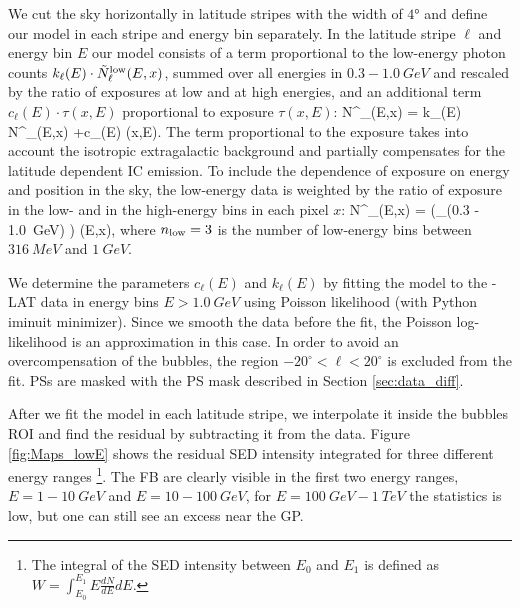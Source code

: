 We cut the sky horizontally in latitude stripes with the width of $\ang{4}$ and define our model in each stripe and energy bin separately. 
In the latitude stripe $\ell$ and energy bin $E$ our model consists of a term proportional to the low-energy photon counts 
$k_{\ell}(E) \cdot \tilde N^{\text{low}}_\ell(E, x)$, summed over all energies in $0.3 - \SI{1.0}{GeV}$ 
and rescaled by the ratio of exposures at low and at high energies,
and an additional term $c_\ell(E) \cdot \tau(x,E)$ proportional to exposure $\tau(x,E)$:
\be
N^\model_{\ell}(E,x) = k_{\ell}(E) \cdot \tilde N^\low_{\ell}(E,x) +c_\ell(E) \cdot \tau(x,E).
\ee
The term proportional to the exposure takes into account the isotropic extragalactic background and partially compensates for the latitude dependent IC emission. To include the dependence of exposure on energy and position in the sky, the low-energy data is weighted by the ratio of exposure in the low- and in the high-energy bins in each pixel $x$:
\be
\tilde N^\low_\ell(E,x) =  \left(\sum_{\epsilon \in (0.3 - \SI{1.0}{GeV})} \right) \cdot \tau(E,x),
\ee
where $n_{\text{low}} = 3$ is the number of low-energy bins between $\SI{316}{MeV}$ and $\SI{1}{GeV}$.


We determine the parameters $c_{\ell}(E)$ and $k_{\ell}(E)$ by fitting the model to the \Fermi-LAT data in energy bins $E > \SI{1.0}{GeV}$
using Poisson likelihood (with Python iminuit minimizer). Since we smooth the data before the fit, the Poisson log-likelihood is an approximation in this case. 
In order to avoid an overcompensation of the \Fermi bubbles, the region $-20^\circ < \ell < 20^\circ$ is excluded from the fit. PSs are masked with the PS mask described in Section \ref{sec:data_diff}.


After we fit the model in each latitude stripe, we interpolate it inside the bubbles ROI and find the residual by subtracting it from the data.
Figure \ref{fig:Maps_lowE} shows the residual SED intensity integrated for three different energy ranges%
\footnote{The integral of the SED intensity between $E_0$ and $E_1$ is defined as
$W = \int_{E_0}^{E_1} E \frac{dN}{dE} dE.$}.
The FB are clearly visible in the first two energy ranges, $E = 1 - \SI{10}{GeV}$ and $E = 10 - \SI{100}{GeV}$, for 
$E = \SI{100}{GeV} - \SI{1}{TeV}$ the statistics is low, but one can still see an excess near the GP.

